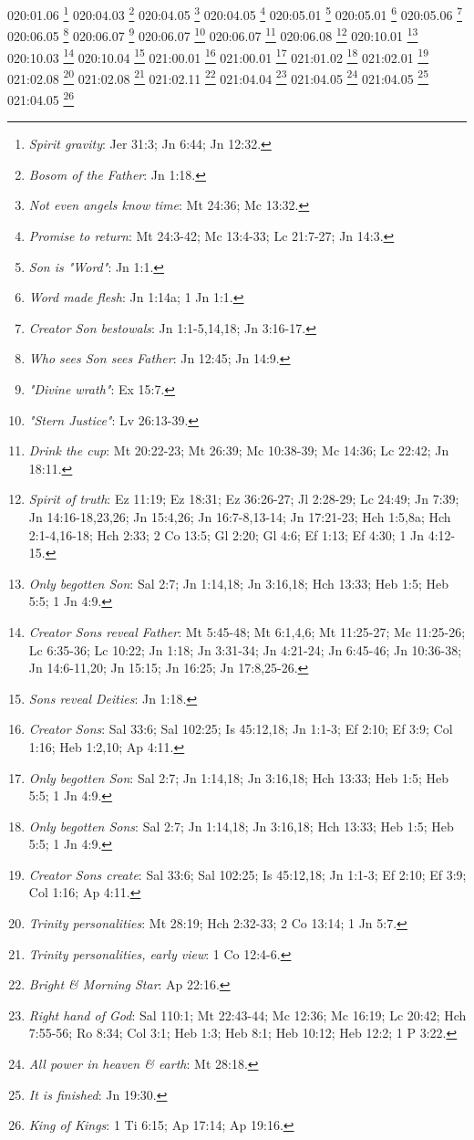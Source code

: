 {020:01.06 \footnote{\textit{Spirit gravity}: Jer 31:3; Jn 6:44; Jn 12:32.}
020:04.03 \footnote{\textit{Bosom of the Father}: Jn 1:18.}
020:04.05 \footnote{\textit{Not even angels know time}: Mt 24:36; Mc 13:32.}
020:04.05 \footnote{\textit{Promise to return}: Mt 24:3-42; Mc 13:4-33; Lc 21:7-27; Jn 14:3.}
020:05.01 \footnote{\textit{Son is "Word"}: Jn 1:1.}
020:05.01 \footnote{\textit{Word made flesh}: Jn 1:14a; 1 Jn 1:1.}
020:05.06 \footnote{\textit{Creator Son bestowals}: Jn 1:1-5,14,18; Jn 3:16-17.}
020:06.05 \footnote{\textit{Who sees Son sees Father}: Jn 12:45; Jn 14:9.}
020:06.07 \footnote{\textit{"Divine wrath"}: Ex 15:7.}
020:06.07 \footnote{\textit{"Stern Justice"}: Lv 26:13-39.}
020:06.07 \footnote{\textit{Drink the cup}: Mt 20:22-23; Mt 26:39; Mc 10:38-39; Mc 14:36; Lc 22:42; Jn 18:11.}
020:06.08 \footnote{\textit{Spirit of truth}: Ez 11:19; Ez 18:31; Ez 36:26-27; Jl 2:28-29; Lc 24:49; Jn 7:39; Jn 14:16-18,23,26; Jn 15:4,26; Jn 16:7-8,13-14; Jn 17:21-23; Hch 1:5,8a; Hch 2:1-4,16-18; Hch 2:33; 2 Co 13:5; Gl 2:20; Gl 4:6; Ef 1:13; Ef 4:30; 1 Jn 4:12-15.}
020:10.01 \footnote{\textit{Only begotten Son}: Sal 2:7; Jn 1:14,18; Jn 3:16,18; Hch 13:33; Heb 1:5; Heb 5:5; 1 Jn 4:9.}
020:10.03 \footnote{\textit{Creator Sons reveal Father}: Mt 5:45-48; Mt 6:1,4,6; Mt 11:25-27; Mc 11:25-26; Lc 6:35-36; Lc 10:22; Jn 1:18; Jn 3:31-34; Jn 4:21-24; Jn 6:45-46; Jn 10:36-38; Jn 14:6-11,20; Jn 15:15; Jn 16:25; Jn 17:8,25-26.}
020:10.04 \footnote{\textit{Sons reveal Deities}: Jn 1:18.}
021:00.01 \footnote{\textit{Creator Sons}: Sal 33:6; Sal 102:25; Is 45:12,18; Jn 1:1-3; Ef 2:10; Ef 3:9; Col 1:16; Heb 1:2,10; Ap 4:11.}
021:00.01 \footnote{\textit{Only begotten Son}: Sal 2:7; Jn 1:14,18; Jn 3:16,18; Hch 13:33; Heb 1:5; Heb 5:5; 1 Jn 4:9.}
021:01.02 \footnote{\textit{Only begotten Sons}: Sal 2:7; Jn 1:14,18; Jn 3:16,18; Hch 13:33; Heb 1:5; Heb 5:5; 1 Jn 4:9.}
021:02.01 \footnote{\textit{Creator Sons create}: Sal 33:6; Sal 102:25; Is 45:12,18; Jn 1:1-3; Ef 2:10; Ef 3:9; Col 1:16; Ap 4:11.}
021:02.08 \footnote{\textit{Trinity personalities}: Mt 28:19; Hch 2:32-33; 2 Co 13:14; 1 Jn 5:7.}
021:02.08 \footnote{\textit{Trinity personalities, early view}: 1 Co 12:4-6.}
021:02.11 \footnote{\textit{Bright & Morning Star}: Ap 22:16.}
021:04.04 \footnote{\textit{Right hand of God}: Sal 110:1; Mt 22:43-44; Mc 12:36; Mc 16:19; Lc 20:42; Hch 7:55-56; Ro 8:34; Col 3:1; Heb 1:3; Heb 8:1; Heb 10:12; Heb 12:2; 1 P 3:22.}
021:04.05 \footnote{\textit{All power in heaven & earth}: Mt 28:18.}
021:04.05 \footnote{\textit{It is finished}: Jn 19:30.}
021:04.05 \footnote{\textit{King of Kings}: 1 Ti 6:15; Ap 17:14; Ap 19:16.}
}
